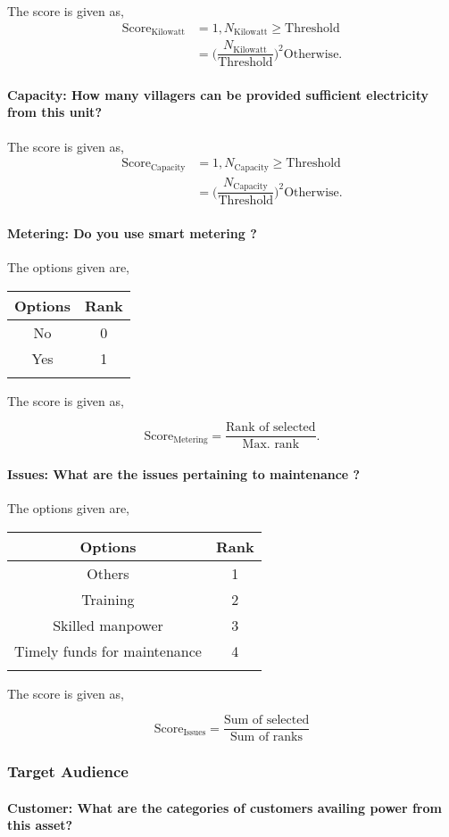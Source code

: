 \documentclass[oneside,twocolumn]{article}
\newcommand{\tsub}[2]{\text{#1}_{\text{#2}}}
\newcommand{\tsubb}[2]{#1_{\text{#2}}}
\newcommand{\dsub}[2]{\dfrac{\text{#1}}{\text{#2}}}
\newcommand{\multsel}[1]
{
	\[
		\tsub{Score}{#1} = \dsub{Sum of selected}{Sum of ranks}
	\]
}
\newcommand{\singsel}[1]
{
	\[
		\tsub{Score}{#1} = \dsub{Rank of selected}{Max. rank}.
	\]
}
\newenvironment{ttable}
{
\begin{center}
\begin{tabular}{c|c}
\hline
}
{
\\ \hline
\end{tabular}
\end{center}
}
\begin{document}
The score is given as,
\begin{align*}
\tsub{Score}{Kilowatt} &= 1, \tsubb{N}{Kilowatt} \ge \text{Threshold} \\
        &=
\Big(\dfrac{\tsubb{N}{Kilowatt}}{\text{Threshold}}\Big)^{2}
\text{Otherwise}.
\end{align*}
\paragraph{Capacity: How many villagers can be provided sufficient electricity from this unit?}

The score is given as,
\begin{align*}
\tsub{Score}{Capacity} &= 1, \tsubb{N}{Capacity} \ge \text{Threshold} \\
        &=
\Big(\dfrac{\tsubb{N}{Capacity}}{\text{Threshold}}\Big)^{2}
\text{Otherwise}.
\end{align*}
\paragraph{Metering: Do you use smart metering ?}

The options given are,
\begin{ttable}
Options & Rank \\ \hline
No & 0 \\
Yes & 1 \\
\hline
\end{ttable}
The score is given as,
\singsel{Metering}
\paragraph{Issues: What are the issues pertaining to maintenance ?}

The options given are,
\begin{ttable}
Options & Rank \\ \hline
Others & 1 \\
Training & 2 \\
Skilled manpower & 3 \\
Timely funds for maintenance & 4 \\
\hline
\end{ttable}
The score is given as,
\multsel{Issues}
\subsubsection{Target Audience}

\paragraph{Customer: What are the categories of customers availing power from this asset?}
\end{document}
